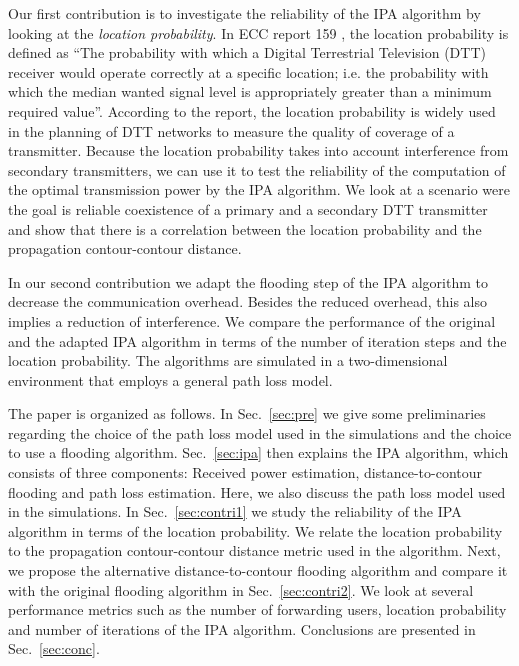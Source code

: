 Our first contribution is to investigate the reliability of the IPA algorithm by looking at the \textit{location probability}. In ECC report 159 \cite{ecc}, the location probability is defined as ``The probability with which a Digital Terrestrial Television (DTT) receiver would operate correctly at a specific location; i.e. the probability with which the median wanted signal level is appropriately greater than a minimum required value''.  According to the report, the location probability is widely used in the planning of DTT networks to measure the quality of coverage of a transmitter. Because the location probability takes into account interference from secondary transmitters, we can use it to test the reliability of the computation of the optimal transmission power by the IPA algorithm. We look at a scenario were the goal is reliable coexistence of a primary and a secondary DTT transmitter and show that there is a correlation between the location probability and the propagation contour-contour distance. 

In our second contribution we adapt the flooding step of the IPA algorithm to decrease the communication overhead. Besides the reduced overhead, this also implies a reduction of interference. We compare the performance of the original and the adapted IPA algorithm in terms of the number of iteration steps and the location probability. The algorithms are simulated in a two-dimensional environment that employs a general path loss model.

The paper is organized as follows. In Sec.~\ref{sec:pre} we give some preliminaries regarding the choice of the path loss model used in the simulations and the choice to use a flooding algorithm. Sec.~\ref{sec:ipa} then explains the IPA algorithm, which consists of three components: Received power estimation, distance-to-contour flooding and path loss estimation. Here, we also discuss the path loss model used in the simulations. In Sec.~\ref{sec:contri1} we study the reliability of the IPA algorithm in terms of the location probability. We relate the location probability to the propagation contour-contour distance metric used in the algorithm. Next, we propose the alternative distance-to-contour flooding algorithm and compare it with the original flooding algorithm in Sec.~\ref{sec:contri2}. We look at several performance metrics such as the number of forwarding users, location probability and number of iterations of the IPA algorithm. Conclusions are presented in Sec.~\ref{sec:conc}. 

%